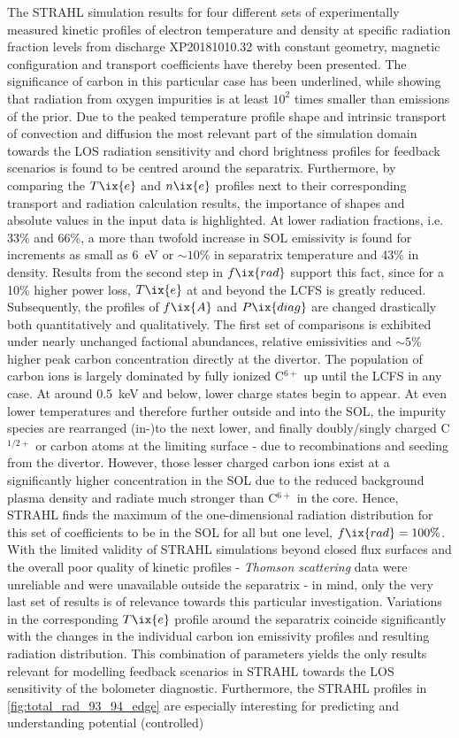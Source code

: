         The STRAHL simulation results for four different sets of experimentally measured kinetic profiles of electron temperature and density at specific radiation fraction levels from discharge XP20181010.32 with constant geometry, magnetic configuration and transport coefficients have thereby been presented. The significance of carbon in this particular case has been underlined, while showing that radiation from oxygen impurities is at least $10^{2}$ times smaller than emissions of the prior. Due to the peaked temperature profile shape and intrinsic transport of convection and diffusion the most relevant part of the simulation domain towards the LOS radiation sensitivity and chord brightness profiles for feedback scenarios is found to be centred around the separatrix. Furthermore, by comparing the $T\ix{e}$ and $n\ix{e}$ profiles next to their corresponding transport and radiation calculation results, the importance of shapes and absolute values in the input data is highlighted. At lower radiation fractions, i.e. 33\% and 66\%, a more than twofold increase in SOL emissivity is found for increments as small as \SI{6}{\electronvolt} or $\sim10\%$ in separatrix temperature and 43\% in density. Results from the second step in $f\ix{rad}$ support this fact, since for a 10\% higher power loss, $T\ix{e}$ at and beyond the LCFS is greatly reduced. Subsequently, the profiles of $f\ix{A}$ and $P\ix{diag}$ are changed drastically both quantitatively and qualitatively. The first set of comparisons is exhibited under nearly unchanged factional abundances, relative emissivities and $\sim5\%$ higher peak carbon concentration directly at the divertor. The population of carbon ions is largely dominated by fully ionized C$^{6+}$ up until the LCFS in any case. At around \SI{0.5}{\kilo\electronvolt} and below, lower charge states begin to appear. At even lower temperatures and therefore further outside and into the SOL, the impurity species are rearranged (in-)to the next lower, and finally doubly/singly charged C$^{1/2+}$ or carbon atoms at the limiting surface - due to recombinations and seeding from the divertor. However, those lesser charged carbon ions exist at a significantly higher concentration in the SOL due to the reduced background plasma density and radiate much stronger than C$^{6+}$ in the core. Hence, STRAHL finds the maximum of the one-dimensional radiation distribution for this set of coefficients to be in the SOL for all but one level, $f\ix{rad}=100\%$. With the limited validity of STRAHL simulations beyond closed flux surfaces and the overall poor quality of kinetic profiles - \textit{Thomson scattering} data were unreliable and were unavailable outside the separatrix - in mind, only the very last set of results is of relevance towards this particular investigation. Variations in the corresponding $T\ix{e}$ profile around the separatrix coincide significantly with the changes in the individual carbon ion emissivity profiles and resulting radiation distribution. This combination of parameters yields the only results relevant for modelling feedback scenarios in STRAHL towards the LOS sensitivity of the bolometer diagnostic. Furthermore, the STRAHL profiles in \cref{fig:total_rad_93_94_edge} are especially interesting for predicting and understanding potential (controlled) 